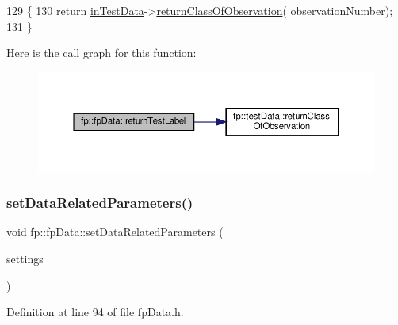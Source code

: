 \begin{DoxyCode}
129                                                              \{
130                 \textcolor{keywordflow}{return} \hyperlink{classfp_1_1fpData_ad4f4dd3a8d15633b7f983932fa60bbad}{inTestData}->\hyperlink{classfp_1_1testData_a3a964b20b07dd4b49e958fdde93ebc59}{returnClassOfObservation}(
      observationNumber);
131             \}
\end{DoxyCode}
Here is the call graph for this function\+:
\nopagebreak
\begin{figure}[H]
\begin{center}
\leavevmode
\includegraphics[width=350pt]{classfp_1_1fpData_a50b6343c52560d1992de50e8cd6b1206_cgraph}
\end{center}
\end{figure}
\mbox{\label{classfp_1_1fpData_ab48923d57206e17b88f0d89833051b43}} 
\subsubsection{\texorpdfstring{set\+Data\+Related\+Parameters()}{setDataRelatedParameters()}}
{\footnotesize\ttfamily void fp\+::fp\+Data\+::set\+Data\+Related\+Parameters (\begin{DoxyParamCaption}\item[{\hyperlink{classfp_1_1fpInfo}{fp\+Info} \&}]{settings }\end{DoxyParamCaption})\hspace{0.3cm}{\ttfamily [inline]}}



Definition at line 94 of file fp\+Data.\+h.


